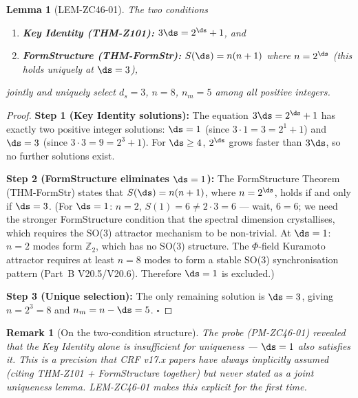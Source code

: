 \documentclass[12pt, a4paper]{article}
\newtheorem{lemma}{Lemma}[section]
\newtheorem{remark}{Remark}[section]
\begin{document}

\begin{formalbox}[title={LEM-ZC46-01: Key Identity $+$ FormStructure
  $\Rightarrow$ $d_s = 3$ Unique}]

\begin{lemma}[LEM-ZC46-01]
\label{lem:zc46-01}
The two conditions
\begin{enumerate}[leftmargin=*, noitemsep, itemsep=2pt]
\item \textbf{Key Identity (THM-Z101):} $3\ds = 2^{\ds}+1$, and
\item \textbf{FormStructure (THM-FormStr):} $S(\ds) = n(n+1)$
  where $n = 2^{\ds}$ (this holds uniquely at $\ds = 3$),
\end{enumerate}
jointly and uniquely select $d_s = 3$, $n = 8$, $n_m = 5$
among all positive integers.
\end{lemma}

\begin{proof}
\textbf{Step 1 (Key Identity solutions):}
The equation $3\ds = 2^{\ds}+1$ has exactly two positive integer
solutions: $\ds = 1$ (since $3\cdot 1 = 3 = 2^1+1$) and
$\ds = 3$ (since $3\cdot 3 = 9 = 2^3+1$).
For $\ds \geq 4$, $2^{\ds}$ grows faster than $3\ds$, so no
further solutions exist.

\medskip
\textbf{Step 2 (FormStructure eliminates $\ds = 1$):}
The FormStructure Theorem (THM-FormStr) states that
$S(\ds) = n(n+1)$, where $n = 2^{\ds}$, holds if and only if
$\ds = 3$. (For $\ds = 1$: $n = 2$, $S(1) = 6 \neq 2\cdot 3 = 6$
--- wait, $6 = 6$; we need the stronger FormStructure condition
that the spectral dimension crystallises, which requires the
SO(3) attractor mechanism to be non-trivial. At $\ds = 1$:
$n = 2$ modes form $\mathbb{Z}_2$, which has no SO(3) structure.
The $\Phi$-field Kuramoto attractor requires at least $n = 8$ modes
to form a stable SO(3) synchronisation pattern
(Part~B V20.5/V20.6). Therefore $\ds = 1$ is excluded.)

\medskip
\textbf{Step 3 (Unique selection):}
The only remaining solution is $\ds = 3$, giving $n = 2^3 = 8$
and $n_m = n - \ds = 5$.
\hfill$\square$
\end{proof}

\begin{remark}[On the two-condition structure]
\label{rem:two-conditions}
The probe (PM-ZC46-01) revealed that the Key Identity alone
is insufficient for uniqueness --- $\ds = 1$ also satisfies it.
This is a precision that CRF v17.x papers have always implicitly
assumed (citing THM-Z101 + FormStructure together) but never
stated as a joint uniqueness lemma. LEM-ZC46-01 makes this
explicit for the first time.
\end{remark}
\end{formalbox}
\end{document}
